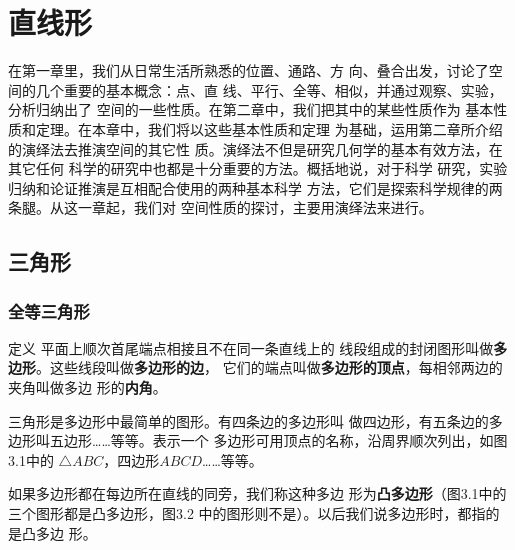 \chapter{直线形}

在第一章里，我们从日常生活所熟悉的位置、通路、方
向、叠合出发，讨论了空间的几个重要的基本概念：点、直
线、平行、全等、相似，并通过观察、实验，分析归纳出了
空间的一些性质。在第二章中，我们把其中的某些性质作为
基本性质和定理。在本章中，我们将以这些基本性质和定理
为基础，运用第二章所介绍的演绎法去推演空间的其它性
质。演绎法不但是研究几何学的基本有效方法，在其它任何
科学的研究中也都是十分重要的方法。概括地说，对于科学
研究，实验归纳和论证推演是互相配合使用的两种基本科学
方法，它们是探索科学规律的两条腿。从这一章起，我们对
空间性质的探讨，主要用演绎法来进行。
\section{三角形}

\subsection{全等三角形}

\begin{blk}{定义}
    平面上顺次首尾端点相接且不在同一条直线上的
线段组成的封闭图形叫做\textbf{多边形}。这些线段叫做\textbf{多边形的边}，
它们的端点叫做\textbf{多边形的顶点}，每相邻两边的夹角叫做多边
形的\textbf{内角}。
\end{blk}


三角形是多边形中最简单的图形。有四条边的多边形叫
做四边形，有五条边的多边形叫五边形……等等。表示一个
多边形可用顶点的名称，沿周界顺次列出，如图3.1中的
$\triangle ABC$，四边形$ABCD$……等等。

如果多边形都在每边所在直线的同旁，我们称这种多边
形为\textbf{凸多边形}（图3.1中的三个图形都是凸多边形，图3.2
中的图形则不是）。以后我们说多边形时，都指的是凸多边
形。
\begin{figure}[htp]
    \centering
    \caption{}
\end{figure}

